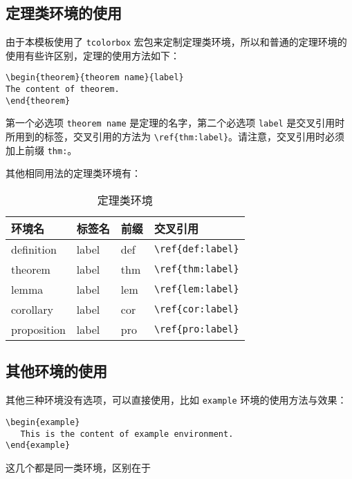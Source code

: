 \documentclass[cn,11pt]{elegantbook}
\begin{document}
\subsection{定理类环境的使用}

由于本模板使用了 \lstinline{tcolorbox} 宏包来定制定理类环境，所以和普通的定理环境的使用有些许区别，定理的使用方法如下：
\begin{lstlisting}
\begin{theorem}{theorem name}{label}
The content of theorem.
\end{theorem}
\end{lstlisting}

第一个必选项 \lstinline{theorem name} 是定理的名字，第二个必选项 \lstinline{label} 是交叉引用时所用到的标签，交叉引用的方法为 \verb|\ref{thm:label}|。请注意，交叉引用时必须加上前缀 \lstinline{thm:}。

其他相同用法的定理类环境有：

\begin{table}[htbp]
   \centering
   \caption{定理类环境}
     \begin{tabular}{llll}
     \toprule
     环境名 & 标签名 & 前缀 & 交叉引用 \\
     \midrule
     definition & label & def   & \lstinline|\ref{def:label}| \\
     theorem & label & thm   & \lstinline|\ref{thm:label}| \\
     lemma & label & lem   & \lstinline|\ref{lem:label}| \\
     corollary & label & cor   & \lstinline|\ref{cor:label}| \\
     proposition & label & pro   & \lstinline|\ref{pro:label}| \\
     \bottomrule
     \end{tabular}%
   \label{tab:theorem-class}%
 \end{table}%
 

\subsection{其他环境的使用}

其他三种环境没有选项，可以直接使用，比如 \lstinline{example} 环境的使用方法与效果：
\begin{lstlisting}
\begin{example}
   This is the content of example environment.
\end{example}
\end{lstlisting}

这几个都是同一类环境，区别在于
\end{document}
